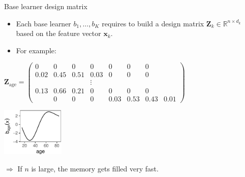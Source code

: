 \documentclass[ignorenonframetext,]{beamer}
\providecommand{\tightlist}{%
  \setlength{\itemsep}{0pt}\setlength{\parskip}{0pt}}
\begin{document}
\begin{frame}{Base learner design matrix}
\protect\hypertarget{base-learner-design-matrix}{}
\begin{itemize}
\tightlist
\item
  Each base learner \(b_1, \dots, b_K\) requires to build a design
  matrix \(\bm{Z}_k\in\mathbb{R}^{n\times d_k}\) based on the feature
  vector \(\bm{x}_k\).
\item
  For example:
\end{itemize}

\vspace{-0.4cm}
\begin{minipage}{0.75\textwidth}
{\tiny $
\bm{Z}_{\text{age}} = \begin{pmatrix}
    0 & 0 & 0 & 0 & 0 & 0 & 0  \\
    0.02 & 0.45 & 0.51 & 0.03 & 0 & 0 & 0 \\
    & & & \vdots & & & \\
    0.13 & 0.66 & 0.21 & 0 & 0 & 0 & 0 \\
    & 0 & 0 & 0 & 0.03 & 0.53 & 0.43 & 0.01
\end{pmatrix}
$}\hspace{0.2cm}{\Large $\Rightarrow$}
\end{minipage}
\begin{minipage}{0.2\textwidth}
\phantom{a}\vspace{0.4cm}\hspace*{0.5cm}

\includegraphics[width=3cm]{figures/unnamed-chunk-2-1} 
\end{minipage}

\(\Rightarrow\) If \(n\) is large, the memory gets filled very fast.
\end{frame}
\end{document}
